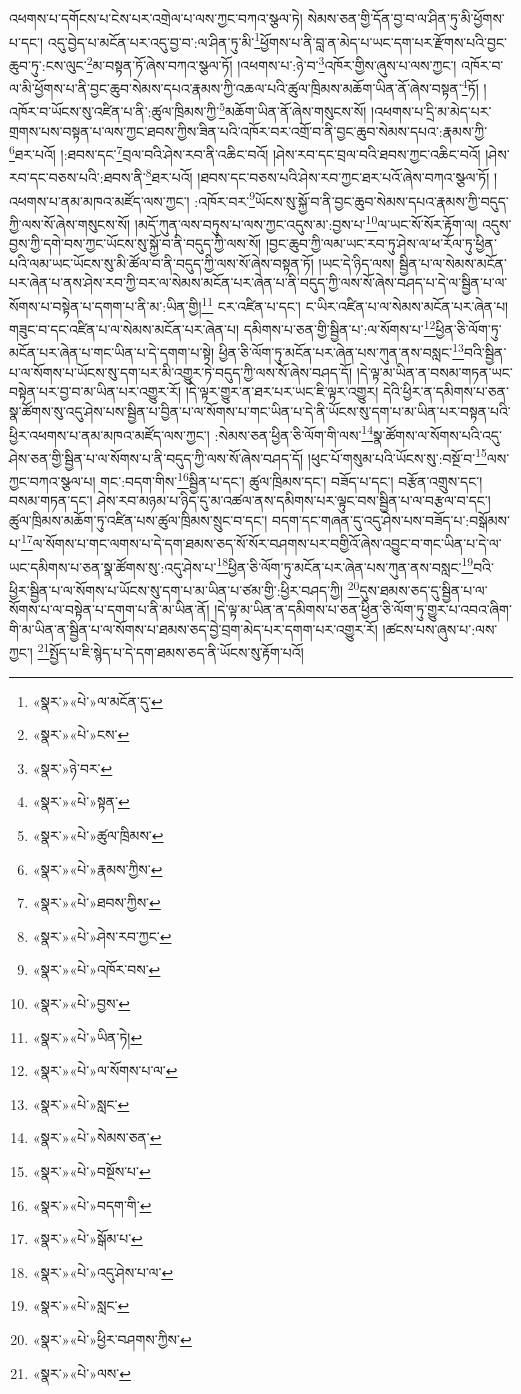 འཕགས་པ་དགོངས་པ་ངེས་པར་འགྲེལ་པ་ལས་ཀྱང་བཀའ་སྩལ་ཏེ། སེམས་ཅན་གྱི་དོན་བྱ་བ་ལ་ཤིན་ཏུ་མི་ཕྱོགས་པ་དང་། འདུ་བྱེད་པ་མངོན་པར་འདུ་བྱ་བ་:ལ་ཤིན་ཏུ་མི་\footnote{«སྣར་»«པེ་»ལ་མངོན་དུ་}ཕྱོགས་པ་ནི་བླ་ན་མེད་པ་ཡང་དག་པར་རྫོགས་པའི་བྱང་ཆུབ་ཏུ་:ངས་ལུང་\footnote{«སྣར་»«པེ་»ངས་}མ་བསྟན་ཏོ་ཞེས་བཀའ་སྩལ་ཏོ། །འཕགས་པ་:ཉེ་བ་\footnote{«སྣར་»ཉེ་བར་}འཁོར་གྱིས་ཞུས་པ་ལས་ཀྱང་། འཁོར་བ་ལ་མི་ཕྱོགས་པ་ནི་བྱང་ཆུབ་སེམས་དཔའ་རྣམས་ཀྱི་འཆལ་པའི་ཚུལ་ཁྲིམས་མཆོག་ཡིན་ནོ་ཞེས་བསྟན་\footnote{«སྣར་»«པེ་»སྟན་}ཏོ། །འཁོར་བ་ཡོངས་སུ་འཛིན་པ་ནི་:ཚུལ་ཁྲིམས་ཀྱི་\footnote{«སྣར་»«པེ་»ཚུལ་ཁྲིམས་}མཆོག་ཡིན་ནོ་ཞེས་གསུངས་སོ། །འཕགས་པ་དྲི་མ་མེད་པར་གྲགས་པས་བསྟན་པ་ལས་ཀྱང་ཐབས་ཀྱིས་ཟིན་པའི་འཁོར་བར་འགྲོ་བ་ནི་བྱང་ཆུབ་སེམས་དཔའ་:རྣམས་ཀྱི་\footnote{«སྣར་»«པེ་»རྣམས་ཀྱིས་}ཐར་པའོ། །:ཐབས་དང་\footnote{«སྣར་»«པེ་»ཐབས་ཀྱིས་}བྲལ་བའི་ཤེས་རབ་ནི་འཆིང་བའོ། །ཤེས་རབ་དང་བྲལ་བའི་ཐབས་ཀྱང་འཆིང་བའོ། །ཤེས་རབ་དང་བཅས་པའི་:ཐབས་ནི་\footnote{«སྣར་»«པེ་»ཤེས་རབ་ཀྱང་}ཐར་པའོ། །ཐབས་དང་བཅས་པའི་ཤེས་རབ་ཀྱང་ཐར་པའོ་ཞེས་བཀའ་སྩལ་ཏོ། །འཕགས་པ་ནམ་མཁའ་མཛོད་ལས་ཀྱང་། :འཁོར་བར་\footnote{«སྣར་»«པེ་»འཁོར་བས་}ཡོངས་སུ་སྐྱོ་བ་ནི་བྱང་ཆུབ་སེམས་དཔའ་རྣམས་ཀྱི་བདུད་ཀྱི་ལས་སོ་ཞེས་གསུངས་སོ། །མདོ་ཀུན་ལས་བཏུས་པ་ལས་ཀྱང་འདུས་མ་:བྱས་པ་\footnote{«སྣར་»«པེ་»བྱས་}ལ་ཡང་སོ་སོར་རྟོག་ལ། འདུས་བྱས་ཀྱི་དགེ་བས་ཀྱང་ཡོངས་སུ་སྐྱོ་བ་ནི་བདུད་ཀྱི་ལས་སོ། །བྱང་ཆུབ་ཀྱི་ལམ་ཡང་རབ་ཏུ་ཤེས་ལ་ཕ་རོལ་ཏུ་ཕྱིན་པའི་ལམ་ཡང་ཡོངས་སུ་མི་ཚོལ་བ་ནི་བདུད་ཀྱི་ལས་སོ་ཞེས་བསྟན་ཏོ། །ཡང་དེ་ཉིད་ལས། སྦྱིན་པ་ལ་སེམས་མངོན་པར་ཞེན་པ་ནས་ཤེས་རབ་ཀྱི་བར་ལ་སེམས་མངོན་པར་ཞེན་པ་ནི་བདུད་ཀྱི་ལས་སོ་ཞེས་བཤད་པ་དེ་ལ་སྦྱིན་པ་ལ་སོགས་པ་བསྟེན་པ་དགག་པ་ནི་མ་:ཡིན་གྱི།\footnote{«སྣར་»«པེ་»ཡིན་ཏེ།} ངར་འཛིན་པ་དང་། ང་ཡིར་འཛིན་པ་ལ་སེམས་མངོན་པར་ཞེན་པ། གཟུང་བ་དང་འཛིན་པ་ལ་སེམས་མངོན་པར་ཞེན་པ། དམིགས་པ་ཅན་གྱི་སྦྱིན་པ་:ལ་སོགས་པ་\footnote{«སྣར་»«པེ་»ལ་སོགས་པ་ལ་}ཕྱིན་ཅི་ལོག་ཏུ་མངོན་པར་ཞེན་པ་གང་ཡིན་པ་དེ་དགག་པ་སྟེ། ཕྱིན་ཅི་ལོག་ཏུ་མངོན་པར་ཞེན་པས་ཀུན་ནས་བསླང་\footnote{«སྣར་»«པེ་»སླང་}བའི་སྦྱིན་པ་ལ་སོགས་པ་ཡོངས་སུ་དག་པར་མི་འགྱུར་ཏེ་བདུད་ཀྱི་ལས་སོ་ཞེས་བཤད་དོ། །དེ་ལྟ་མ་ཡིན་ན་བསམ་གཏན་ཡང་བསྟེན་པར་བྱ་བ་མ་ཡིན་པར་འགྱུར་རོ། །དེ་ལྟར་གྱུར་ན་ཐར་པར་ཡང་ཇི་ལྟར་འགྱུར། དེའི་ཕྱིར་ན་དམིགས་པ་ཅན་སྣ་ཚོགས་སུ་འདུ་ཤེས་པས་སྦྱིན་པ་བྱིན་པ་ལ་སོགས་པ་གང་ཡིན་པ་དེ་ནི་ཡོངས་སུ་དག་པ་མ་ཡིན་པར་བསྟན་པའི་ཕྱིར་འཕགས་པ་ནམ་མཁའ་མཛོད་ལས་ཀྱང་། :སེམས་ཅན་ཕྱིན་ཅི་ལོག་གི་ལས་\footnote{«སྣར་»«པེ་»སེམས་ཅན་}སྣ་ཚོགས་ལ་སོགས་པའི་འདུ་ཤེས་ཅན་གྱི་སྦྱིན་པ་ལ་སོགས་པ་ནི་བདུད་ཀྱི་ལས་སོ་ཞེས་བཤད་དོ། །ཕུང་པོ་གསུམ་པའི་ཡོངས་སུ་:བསྔོ་བ་\footnote{«སྣར་»«པེ་»བསྔོས་པ་}ལས་ཀྱང་བཀའ་སྩལ་པ། གང་:བདག་གིས་\footnote{«སྣར་»«པེ་»བདག་གི་}སྦྱིན་པ་དང་། ཚུལ་ཁྲིམས་དང་། བཟོད་པ་དང་། བརྩོན་འགྲུས་དང་། བསམ་གཏན་དང་། ཤེས་རབ་མཉམ་པ་ཉིད་དུ་མ་འཚལ་ནས་དམིགས་པར་ལྟུང་བས་སྦྱིན་པ་ལ་བརྩལ་བ་དང་། ཚུལ་ཁྲིམས་མཆོག་ཏུ་འཛིན་པས་ཚུལ་ཁྲིམས་སྲུང་བ་དང་། བདག་དང་གཞན་དུ་འདུ་ཤེས་པས་བཟོད་པ་:བསྒོམས་པ་\footnote{«སྣར་»«པེ་»སྒོམ་པ་}ལ་སོགས་པ་གང་ལགས་པ་དེ་དག་ཐམས་ཅད་སོ་སོར་བཤགས་པར་བགྱིའོ་ཞེས་འབྱུང་བ་གང་ཡིན་པ་དེ་ལ་ཡང་དམིགས་པ་ཅན་སྣ་ཚོགས་སུ་:འདུ་ཤེས་པ་\footnote{«སྣར་»«པེ་»འདུ་ཤེས་པ་ལ་}ཕྱིན་ཅི་ལོག་ཏུ་མངོན་པར་ཞེན་པས་ཀུན་ནས་བསླང་\footnote{«སྣར་»«པེ་»སླང་}བའི་ཕྱིར་སྦྱིན་པ་ལ་སོགས་པ་ཡོངས་སུ་དག་པ་མ་ཡིན་པ་ཙམ་གྱི་:ཕྱིར་བཤད་ཀྱི། \footnote{«སྣར་»«པེ་»ཕྱིར་བཤགས་ཀྱིས་}དུས་ཐམས་ཅད་དུ་སྦྱིན་པ་ལ་སོགས་པ་ལ་བསྟེན་པ་དགག་པ་ནི་མ་ཡིན་ནོ། །དེ་ལྟ་མ་ཡིན་ན་དམིགས་པ་ཅན་ཕྱིན་ཅི་ལོག་ཏུ་གྱུར་པ་འབའ་ཞིག་གི་མ་ཡིན་ན་སྦྱིན་པ་ལ་སོགས་པ་ཐམས་ཅད་བྱེ་བྲག་མེད་པར་དགག་པར་འགྱུར་རོ། །ཚངས་པས་ཞུས་པ་:ལས་ཀྱང་། \footnote{«སྣར་»«པེ་»ལས་}སྤྱོད་པ་ཇི་སྙེད་པ་དེ་དག་ཐམས་ཅད་ནི་ཡོངས་སུ་རྟོག་པའོ། 